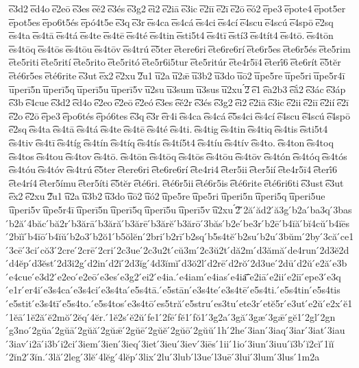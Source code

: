 {͞e3d2
͞ed4o
͞e2eō
͞e3es
͞eé2
͞e3és
͞e3g2
͞ei2
͞e2iā
͞e3ic
͞e2iī
͞e2ī
͞e2ō
͞eó2
͞epe3
͞epote4
͞epot5er
͞epot5es
͞epo6t5és
͞epó4t5e
͞e3q
͞e3r
͞es4ca
͞es4cá
͞es4ci
͞es4cí
͞e4scu
͞e4scú
͞e4spō
͞e2sq
͞es4ta
͞es4tā
͞es4tá
͞es4te
͞es4tē
͞es4té
͞es4tin
͞esti5t4
͞es4tī
͞estí3
͞es4tít4
͞es4tō.
͞es4tōn
͞es4tōq
͞es4tōs
͞es4tōu
͞es4tōv
͞es4trú
͞e5ter
͞etere6ri
͞ete6re6rí
͞ete6r5es
͞ete6r5és
͞ete5rim
͞ete5riti
͞ete5rití
͞ete5rito
͞ete5ritó
͞ete5r6i5tur
͞ete5ritúr
͞ete4r5ī4
͞eterī́6
͞ete6rít
͞e5tĕr
͞eté6r5es
͞eté6rite
͞e3ut
͞ex2
͞e2xu
͞2u1
͞u2a
͞u2ǣ
͞u3b2
͞u3do
͞uō2
͞upe5re
͞upe5ri
͞upe5r4ī
͞uperī5n
͞uperī5q
͞uperī5u
͞uperī5v
͞u2su
͞u3sum
͞u3sus
͞u2xu
́͞2
͡e1
͡ea2b3
͡eắ2
͡e3ác
͡e3áp
͡e3b
͡e4cue
͡e3d2
͡ed4o
͡e2eo
͡e2eō
͡e2eó
͡e3es
͡eé2r
͡e3és
͡e3g2
͡ei2
͡e2iā
͡e3ic
͡e2ii
͡e2iī
͡e2ií
͡e2ī
͡e2o
͡e2ō
͡epe3
͡epo6tés
͡epó6tes
͡e3q
͡e3r
͡er4i
͡es4ca
͡es4cá
͡e5s4ci
͡es4cí
͡e4scu
͡e4scú
͡e4spō
͡e2sq
͡es4ta
͡es4tā
͡es4tá
͡es4te
͡es4tē
͡es4té
͡es4ti.
͡es4tig
͡es4tin
͡es4tiq
͡es4tis
͡esti5t4
͡es4tiv
͡es4tī
͡es4tíg
͡es4tín
͡es4tíq
͡es4tís
͡es4tí5t4
͡es4tíu
͡es4tív
͡es4to.
͡es4ton
͡es4toq
͡es4tos
͡es4tou
͡es4tov
͡es4tō.
͡es4tōn
͡es4tōq
͡es4tōs
͡es4tōu
͡es4tōv
͡es4tón
͡es4tóq
͡es4tós
͡es4tóu
͡es4tóv
͡es4trú
͡e5ter
͡etere6ri
͡ete6re6rí
͡ete4ri4
͡eter5ii
͡eter5ií
͡ete4r5ī4
͡eterī́6
͡ete4rí4
͡eter5ímu
͡eter5íti
͡e5tĕr
͡eté6ri.
͡eté6r5ii
͡eté6r5is
͡eté6rite
͡eté6ri6ti
͡e3ust
͡e3ut
͡ex2
͡e2xu
͡2u1
͡u2a
͡u3b2
͡u3do
͡uō2
͡uó2
͡upe5re
͡upe5ri
͡uperi5n
͡uperi5q
͡uperi5ue
͡uperi5v
͡upe5r4ī
͡uperī5n
͡uperī5q
͡uperī5u
͡uperī5v
͡u2xu
́͡2
́2ă
́ăd2
́ă3g
́b2a
́ba3q
́3bas
́b2ă
́4băc
́bă2r
́b3ărā
́b3ără
́b3ărē
́b3ărĕ
́b3ărō
́3băs
́b2e
́be3r
́b2ē
́b4ĭă
́bĭ4cŭ
́b4ĭēs
́2bĭĭ
́b4ĭō
́b4ĭŭ
́b2o3
́b2ŏ1
́b5ŏlĕn
́2bri
́b2rī
́b2sq
́b5s4tĕ
́b2su
́b2u
́3bŭm
́2by
́3că
́ce1
́3cē
́3ci
́cŏ3
́2cre
́2crē
́2cri
́2c3ue
́2c3u2t
́cŭ3m
́2c3ŭ2t
́dă2m
́d3ămă
́de4run
́2d3ĕ2d
́d4ĕp
́d3ĕst
́2d3i2g
́d2in
́d2ĭ
́2d3ĭg
́4d3ĭmĭ
́d3ŏ2l
́d2rē
́d2rŏ
́2d3ue
́2dū
́d2ŭ
́e2ă
́e3b
́e4cue
́e3d2
́e2eo
́e2eō
́e3es
́e3g2
́ei2
́e4ia.
́e4iam
́e4ias
́e4ia͞
́e2iā
́e2ii
́e2iī
́epe3
́e3q
́e1r
́er4i
́e3s4ca
́e3s4ci
́e3s4ta
́e5s4tā.
́e5stān
́e3s4te
́e3s4tē
́e5s4ti.
́e5s4tin
́e5s4tis
́e5stit
́e3s4tī
́e5s4to.
́e5s4tos
́e3s4tō
́es5tră
́e5stru
́es3tu
́ete3r
́etĕ5r
́e3ut
́e2ŭ
́e2x
́ĕ1
́1ĕā
́1ĕ2ă
́ĕ2mŏ
́2ĕq
́4ĕr.
́1ĕ2s
́ĕ2ŭ
́fe1
́2fē
́fĕ1
́fŏ1
́3g2a
́3gă
́3gæ
́3gǣ
́gĕ1
́2gl
́2gn
́g3no
́2gŭa
́2gŭā
́2gŭă
́2gŭǣ
́2gŭē
́2gŭĕ
́2gŭō
́2gŭŭ
́1h
́2he
́3ian
́3iaq
́3iar
́3iat
́3iau
́3iav
́i2ā
́i3b
́i2ci
́3iem
́3ien
́3ieq
́3iet
́3ieu
́3iev
́3iēs
́1ii
́1io
́3iun
́3iuu
́ĭ3b
́ĭ2cĭ
́1ĭĭ
́2ĭn2
́3ĭn.
́3lă
́2leg
́3lĕ
́4lĕg
́4lĕp
́3lix
́2lu
́3lub
́l3ue
́l3uē
́3lui
́3lum
́3lus
́1m2a
}
